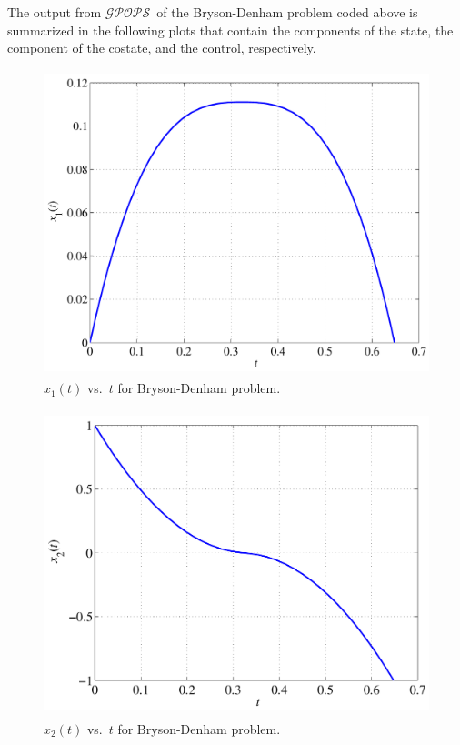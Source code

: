 \documentclass[10pt,final]{report}
\newcommand{\gpops}{$\mathcal{GPOPS}$~}
\begin{document}
\normalsize
The output from \gpops of the Bryson-Denham problem coded
above is summarized in the following plots that contain the components
of the state, the component of the costate, and the control, respectively.
\begin{figure}[H]
  \centering
  \includegraphics[height=3.5in]{x1vstBrysonDenham.pdf}
  \caption{$x_1(t)$ vs.~$t$ for Bryson-Denham problem.}
\end{figure}
\begin{figure}[H]
  \centering
  \includegraphics[height=3.5in]{x2vstBrysonDenham.pdf}
  \caption{$x_2(t)$ vs.~$t$ for Bryson-Denham problem.}
\end{figure}
\end{document}

